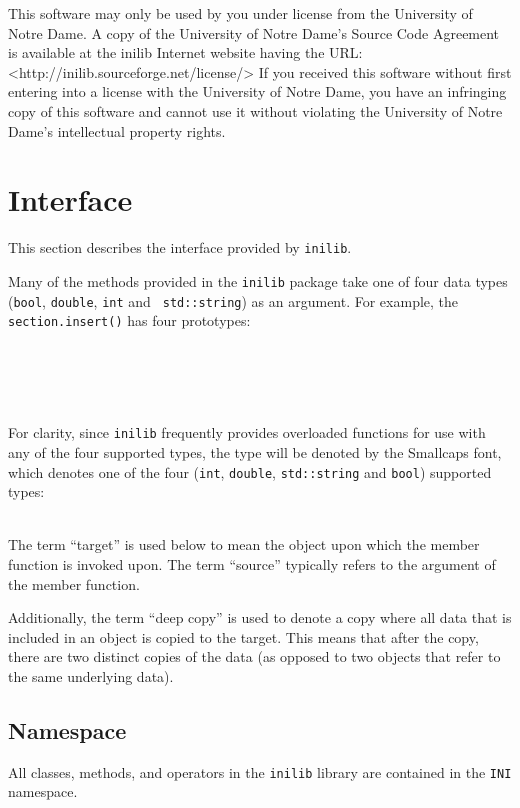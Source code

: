 %
This software may only be used by you under license from the
University of Notre Dame.  A copy of the University of Notre Dame's
Source Code Agreement is available at the inilib Internet website
having the URL: <http://inilib.sourceforge.net/license/> If you
received this software without first entering into a license with the
University of Notre Dame, you have an infringing copy of this software
and cannot use it without violating the University of Notre Dame's
intellectual property rights.
% 
%

\section{Interface}

This section describes the interface provided by {\tt inilib}.

Many of the methods provided in the {\tt inilib} package take one of
four data types ({\tt bool}, {\tt double}, {\tt int} and {\tt
std::string}) as an argument.  For example, the {\tt section.insert()}
has four prototypes:

\vspace{11pt}
 \\
 \\
 \\
 \\

For clarity, since {\tt inilib} frequently provides overloaded
functions for use with any of the four supported types, the type will
be denoted by the {\sc Smallcaps} font, which denotes one of the four
({\tt int}, {\tt double}, {\tt std::string} and {\tt bool}) supported
types:

\vspace{11pt}
 \\

The term ``target'' is used below to mean the object upon which the
member function is invoked upon.  The term ``source'' typically refers
to the argument of the member function.

Additionally, the term ``deep copy'' is used to denote a copy where
all data that is included in an object is copied to the target.  This
means that after the copy, there are two distinct copies of the data
(as opposed to two objects that refer to the same underlying data).

\subsection{Namespace}

All classes, methods, and operators in the {\tt inilib} library are
contained in the {\tt INI} namespace.

